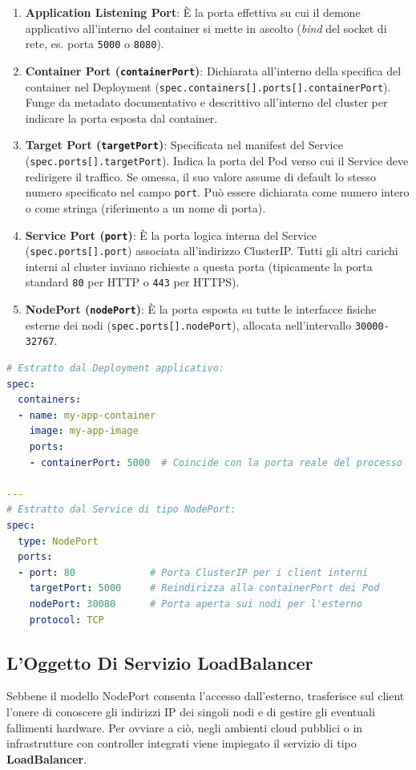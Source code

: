 \documentclass[11pt, a4paper]{article}
\begin{document}
\begin{enumerate}
    \item \textbf{Application Listening Port}: È la porta effettiva su cui il demone applicativo all'interno del container si mette in ascolto (\emph{bind} del socket di rete, es. porta \texttt{5000} o \texttt{8080}).
    \item \textbf{Container Port (\texttt{containerPort})}: Dichiarata all'interno della specifica del container nel Deployment (\texttt{spec.containers[].ports[].containerPort}). Funge da metadato documentativo e descrittivo all'interno del cluster per indicare la porta esposta dal container.
    \item \textbf{Target Port (\texttt{targetPort})}: Specificata nel manifest del Service (\texttt{spec.ports[].targetPort}). Indica la porta del Pod verso cui il Service deve redirigere il traffico. Se omessa, il suo valore assume di default lo stesso numero specificato nel campo \texttt{port}. Può essere dichiarata come numero intero o come stringa (riferimento a un nome di porta).
    \item \textbf{Service Port (\texttt{port})}: È la porta logica interna del Service (\texttt{spec.ports[].port}) associata all'indirizzo ClusterIP. Tutti gli altri carichi interni al cluster inviano richieste a questa porta (tipicamente la porta standard \texttt{80} per HTTP o \texttt{443} per HTTPS).
    \item \textbf{NodePort (\texttt{nodePort})}: È la porta esposta su tutte le interfacce fisiche esterne dei nodi (\texttt{spec.ports[].nodePort}), allocata nell'intervallo \texttt{30000-32767}.
\end{enumerate}

\begin{lstlisting}[language=yaml, caption={Esempio integrato di correlazione delle porte}]
# Estratto dal Deployment applicativo:
spec:
  containers:
  - name: my-app-container
    image: my-app-image
    ports:
    - containerPort: 5000  # Coincide con la porta reale del processo

---
# Estratto dal Service di tipo NodePort:
spec:
  type: NodePort
  ports:
  - port: 80             # Porta ClusterIP per i client interni
    targetPort: 5000     # Reindirizza alla containerPort dei Pod
    nodePort: 30080      # Porta aperta sui nodi per l'esterno
    protocol: TCP
\end{lstlisting}

\subsection{L'Oggetto Di Servizio LoadBalancer}
Sebbene il modello NodePort consenta l'accesso dall'esterno, trasferisce sul client l'onere di conoscere gli indirizzi IP dei singoli nodi e di gestire gli eventuali fallimenti hardware. Per ovviare a ciò, negli ambienti cloud pubblici o in infrastrutture con controller integrati viene impiegato il servizio di tipo \textbf{LoadBalancer}.
\end{document}
